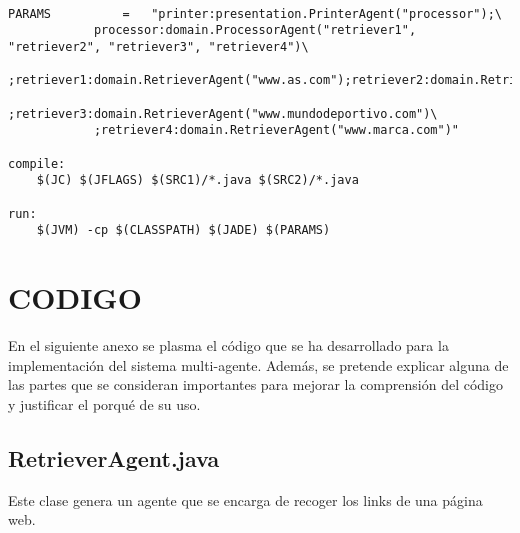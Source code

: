 \documentclass{pre-tfg}
\begin{document}
\begin{lstlisting}[caption=Makefile,style=makefile]

PARAMS 			= 	"printer:presentation.PrinterAgent("processor");\
			processor:domain.ProcessorAgent("retriever1", "retriever2", "retriever3", "retriever4")\
			;retriever1:domain.RetrieverAgent("www.as.com");retriever2:domain.RetrieverAgent("www.sports.es")\
			;retriever3:domain.RetrieverAgent("www.mundodeportivo.com")\
			;retriever4:domain.RetrieverAgent("www.marca.com")" 

compile:
	$(JC) $(JFLAGS) $(SRC1)/*.java $(SRC2)/*.java

run:
	$(JVM) -cp $(CLASSPATH) $(JADE) $(PARAMS)

\end{lstlisting}

\newpage

\appendix
\section{CODIGO}

En el siguiente anexo se plasma el código que se ha desarrollado para la implementación del sistema multi-agente. Además,
se pretende explicar alguna de las partes que se consideran importantes para mejorar la comprensión del código y justificar
el porqué de su uso.

\subsection{RetrieverAgent.java}

Este clase genera un agente que se encarga de recoger los links de una página web.
\end{document}
